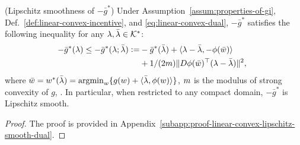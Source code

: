 \begin{lemma} (Lipschitz smoothness of $-\bar{g}^*$)
\label{lem:linear-convex-lipschitz-smooth-dual}
    Under Assumption~\ref{assum:properties-of-gi}, Def.~\ref{def:linear-convex-incentive}, and \eqref{eq:linear-convex-dual}, $-\bar{g}^*$ satisfies the following inequality for any $\lambda, \bar{\lambda} \in \mathcal{K}^*$:
    \begin{equation}
    \label{eq:linear-convex-lipschitz-smooth}
    \begin{split}
        \hspace{-5pt} -\bar{g}^*(\lambda) \leq -\bar{g}^*(\lambda; \bar{\lambda}) := & -\bar{g}^*(\bar{\lambda}) + \langle \lambda - \bar{\lambda}, -\phi(\bar{w})\rangle \\
        & + 1/(2m) \lVert D \phi(\bar{w})^\top (\lambda - \bar{\lambda}) \rVert^2,
    \end{split}
    \end{equation}
    where $\bar{w} = w^*(\bar{\lambda}) = \operatorname*{argmin}_w \{g(w) + \langle \bar{\lambda}, \phi(w)\rangle\}$, $m$ is the modulus of strong convexity of $g$, .
   In particular, when restricted to any compact domain, $-\bar{g}^*$ is Lipschitz smooth.
\end{lemma}

\begin{proof}
The proof is provided in Appendix~\ref{subapp:proof-linear-convex-lipschitz-smooth-dual}.
\end{proof}

